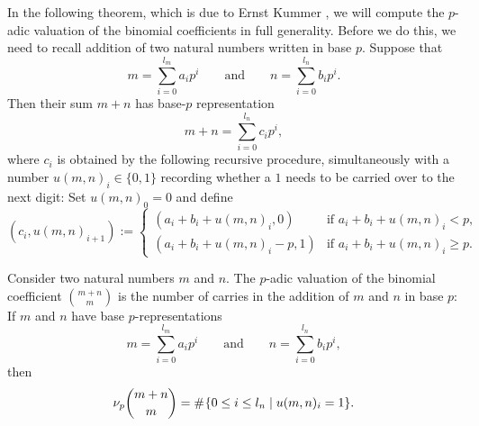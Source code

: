 In the following theorem, which is due to Ernst Kummer \cite{kummer1852}, we will compute the $p$-adic valuation of the binomial coefficients in full generality. Before we do this, we need to recall addition of two natural numbers written in base $p$. Suppose that
\begin{equation*}
  m=\sum_{i=0}^{l_m}a_ip^i\qquad\text{and}\qquad n=\sum_{i=0}^{l_{n}}b_ip^i.
\end{equation*}
Then their sum $m+n$ has base-$p$ representation
\begin{equation*}
  m+n=\sum_{i=0}^{l_n}c_ip^i,
\end{equation*}
where $c_i$ is obtained by the following recursive procedure, simultaneously with a number $u(m,n)_i\in\{0,1\}$ recording whether a $1$ needs to be carried over to the next digit: Set $u(m,n)_0=0$ and define
\begin{equation*}
  (c_i,u(m,n)_{i+1}) :=
  \begin{cases}
    (a_i+b_i+u(m,n)_i,0) & \text{if }a_i+b_i+u(m,n)_i< p, \\
    (a_i+b_i+u(m,n)_i-p,1) & \text{if }a_i+b_i+u(m,n)_i\geq p.
  \end{cases}
\end{equation*}

\begin{theorem}\label{theorem:kummers-theorem}
  Consider two natural numbers $m$ and $n$. The $p$-adic valuation of the binomial coefficient $\binom{m+n}{m}$ is the number of carries in the addition of $m$ and $n$ in base $p$: If $m$ and $n$ have base $p$-representations
  \begin{equation*}
    m = \sum_{i=0}^{l_m}a_ip^i\qquad\text{and}\qquad n = \sum_{i=0}^{l_n}b_ip^i,
  \end{equation*}
  then
  \begin{equation*}
    \nu_p\binom{m+n}{m} = \mathord{\#}\mkern1mu \{0\leq i \leq l_n \mid u(m,n)_i=1\}.
  \end{equation*}
\end{theorem}

